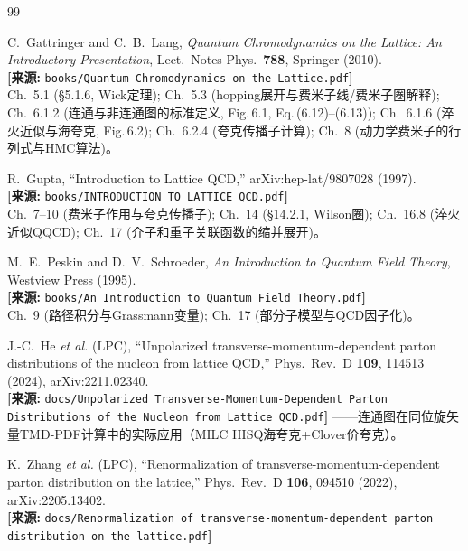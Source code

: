 \documentclass[12pt,a4paper]{ctexart}
\theoremstyle{definition}
\begin{document}
\begin{thebibliography}{99}

C.~Gattringer and C.~B.~Lang,
\textit{Quantum Chromodynamics on the Lattice: An Introductory Presentation},
Lect.\ Notes Phys.\ \textbf{788}, Springer (2010).
\\\textbf{[来源:} \texttt{books/Quantum Chromodynamics on the Lattice.pdf}\textbf{]}
\\Ch.~5.1 (\S 5.1.6, Wick定理); Ch.~5.3 (hopping展开与费米子线/费米子圈解释); Ch.~6.1.2 (连通与非连通图的标准定义, Fig.\,6.1, Eq.\,(6.12)--(6.13)); Ch.~6.1.6 (淬火近似与海夸克, Fig.\,6.2); Ch.~6.2.4 (夸克传播子计算); Ch.~8 (动力学费米子的行列式与HMC算法)。

R.~Gupta,
``Introduction to Lattice QCD,''
arXiv:hep-lat/9807028 (1997).
\\\textbf{[来源:} \texttt{books/INTRODUCTION TO LATTICE QCD.pdf}\textbf{]}
\\Ch.~7--10 (费米子作用与夸克传播子); Ch.~14 (\S 14.2.1, Wilson圈); Ch.~16.8 (淬火近似QQCD); Ch.~17 (介子和重子关联函数的缩并展开)。

M.~E.~Peskin and D.~V.~Schroeder,
\textit{An Introduction to Quantum Field Theory},
Westview Press (1995).
\\\textbf{[来源:} \texttt{books/An Introduction to Quantum Field Theory.pdf}\textbf{]}
\\Ch.~9 (路径积分与Grassmann变量); Ch.~17 (部分子模型与QCD因子化)。

J.-C.~He \textit{et al.} (LPC),
``Unpolarized transverse-momentum-dependent parton distributions of the nucleon from lattice QCD,''
Phys.\ Rev.\ D \textbf{109}, 114513 (2024), arXiv:2211.02340.
\\\textbf{[来源:} \texttt{docs/Unpolarized Transverse-Momentum-Dependent Parton Distributions of the Nucleon from Lattice QCD.pdf}\textbf{]}
——连通图在同位旋矢量TMD-PDF计算中的实际应用（MILC HISQ海夸克+Clover价夸克）。

K.~Zhang \textit{et al.} (LPC),
``Renormalization of transverse-momentum-dependent parton distribution on the lattice,''
Phys.\ Rev.\ D \textbf{106}, 094510 (2022), arXiv:2205.13402.
\\\textbf{[来源:} \texttt{docs/Renormalization of transverse-momentum-dependent parton distribution on the lattice.pdf}\textbf{]}


\end{thebibliography}
\end{document}
